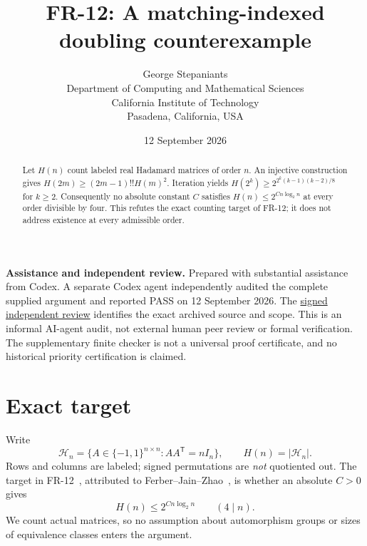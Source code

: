 \documentclass[11pt,a4paper]{article}
\title{\textbf{FR-12: A matching-indexed\\doubling counterexample}}
\author{George Stepaniants\\[3pt]\small Department of Computing and Mathematical Sciences\\\small California Institute of Technology\\\small Pasadena, California, USA}
\date{12 September 2026}
\newcommand{\HH}{\mathcal H}
\begin{document}
\maketitle
\begin{abstract}
Let $H(n)$ count labeled real Hadamard matrices of order $n$. An injective
construction gives $H(2m)\ge(2m-1)!!H(m)^2$. Iteration yields
$H(2^k)\ge 2^{2^k(k-1)(k-2)/8}$ for $k\ge2$.
Consequently no absolute constant $C$ satisfies $H(n)\le2^{Cn\log_2 n}$
at every order divisible by four. This refutes the exact counting target of
FR-12; it does not address existence at every admissible order.
\end{abstract}
\noindent\textbf{Assistance and independent review.}
Prepared with substantial assistance from Codex. A separate Codex agent
independently audited the complete supplied argument and reported PASS on
12 September 2026. The
\href{../../references/stepaniants-fr12-2026-09-12/REVIEW.md}{signed independent review}
identifies the exact archived source and scope. This is an informal AI-agent
audit, not external human peer review or formal verification. The
supplementary finite checker is not a universal proof certificate, and no
historical priority certification is claimed.

\section{Exact target}
Write
\[
 \HH_n=\{A\in\{-1,1\}^{n\times n}:AA^{\mathsf T}=nI_n\},
 \qquad H(n)=|\HH_n|.
\]
Rows and columns are labeled; signed permutations are \emph{not} quotiented
out. The target in FR-12~\cite{catalog}, attributed to
Ferber--Jain--Zhao~\cite{FJZ}, is whether an absolute $C>0$ gives
\begin{equation}\label{eq:target}
 H(n)\le 2^{Cn\log_2 n}\qquad(4\mid n).
\end{equation}
We count actual matrices, so no assumption about automorphism groups or
sizes of equivalence classes enters the argument.
\end{document}
